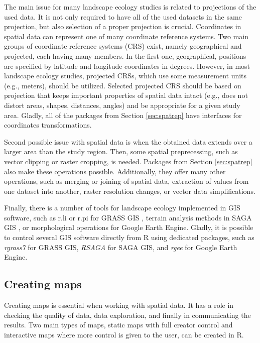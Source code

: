 \documentclass[smallextended]{svjour3}       %
\begin{document}
The main issue for many landscape ecology studies is related to projections of the used data.
It is not only required to have all of the used datasets in the same projection, but also selection of a proper projection is crucial.
Coordinates in spatial data can represent one of many coordinate reference systems.
Two main groups of coordinate reference systems (CRS) exist, namely geographical and projected, each having many members.
In the first one, geographical, positions are specified by latitude and longitude coordinates in degrees.
However, in most landscape ecology studies, projected CRSs, which use some measurement units (e.g., meters), should be utilized.
Selected projected CRS should be based on projection that keeps important properties of spatial data intact (e.g., does not distort areas, shapes, distances, angles) and be appropriate for a given study area.
Gladly, all of the packages from Section \ref{sec:spatrep} have interfaces for coordinates transformations.

Second possible issue with spatial data is when the obtained data extends over a larger area than the study region.
Then, some spatial preprecessing, such as vector clipping or raster cropping, is needed.
Packages from Section \ref{sec:spatrep} also make these operations possible.
Additionally, they offer many other operations, such as merging or joining of spatial data, extraction of values from one dataset into another, raster resolution changes, or vector data simplifications.

Finally, there is a number of tools for landscape ecology implemented in GIS software, such as r.li or r.pi for GRASS GIS \cite{wegmann2018r,neteler2012grass}, terrain analysis methods in SAGA GIS \cite{gmd-8-1991-2015}, or morphological operations for Google Earth Engine.
Gladly, it is possible to control several GIS software directly from R using dedicated packages, such as \emph{rgrass7} \cite{R-grass7} for GRASS GIS, \emph{RSAGA} \cite{R-RSAGA} for SAGA GIS, and \emph{rgee} \cite{R-rgee} for Google Earth Engine.

\hypertarget{creating-maps}{%
\subsection{Creating maps}\label{creating-maps}}

Creating maps is essential when working with spatial data.
It has a role in checking the quality of data, data exploration, and finally in communicating the results.
Two main types of maps, static maps with full creator control and interactive maps where more control is given to the user, can be created in R.
\end{document}
